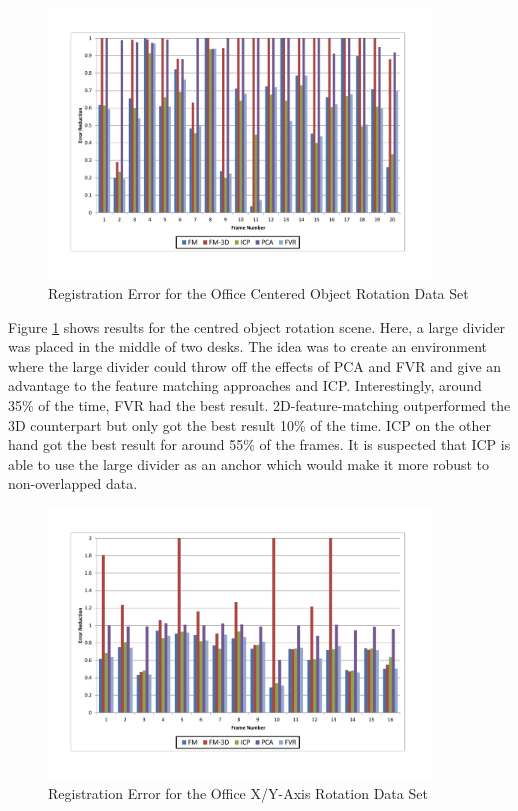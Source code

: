 \begin{figure}[!htb]
\centering
\includegraphics[width=4.0in]{images/results/Office_Texture_blind_spot_rotation}
\caption{Registration Error for the Office Centered Object Rotation Data Set}
\label{fig:PET9}
\end{figure}

Figure \ref{fig:PET9} shows results for the centred object rotation scene. Here, a large divider was placed in the middle of two desks. The idea was to create an environment where the large divider could throw off the effects of PCA and FVR and give an advantage to the feature matching approaches and ICP. Interestingly, around 35\% of the time, FVR had the best result. 2D-feature-matching outperformed the 3D counterpart but only got the best result 10\% of the time. ICP on the other hand got the best result for around 55\% of the frames. It is suspected that ICP is able to use the large divider as an anchor which would make it more robust to non-overlapped data.

\begin{figure}[!htb]
\centering
\includegraphics[width=4.0in]{images/results/Office_Texture_Rotate_XAxis}
\caption{Registration Error for the Office X/Y-Axis Rotation Data Set}
\label{fig:PET10}
\end{figure}

